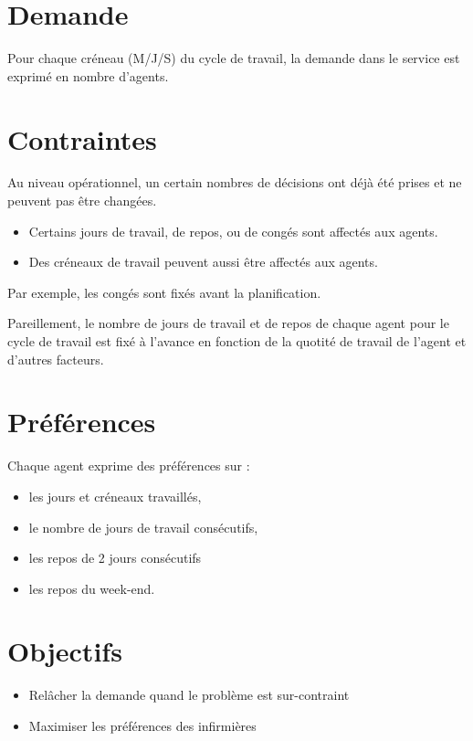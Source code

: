 \documentclass[a4paper]{article}       %
\begin{document}
\section*{Demande}
Pour chaque créneau (M/J/S) du cycle de travail, la demande dans le service est exprimé en nombre d'agents.
\section*{Contraintes}
Au niveau opérationnel, un certain nombres de décisions ont déjà été prises et ne peuvent pas être changées.  
\begin{itemize}
\item Certains jours de travail, de repos, ou de congés sont affectés aux agents.
\item Des créneaux de travail peuvent aussi être affectés aux agents.
\end{itemize}
Par exemple, les congés sont fixés avant la planification.

Pareillement, le nombre de jours de travail et de repos de chaque agent pour le cycle de travail est fixé à l'avance en fonction de la quotité de travail de l'agent et d'autres facteurs. 

\section*{Préférences}
Chaque agent exprime des préférences sur : 
\begin{itemize}
\item les jours et créneaux travaillés,
\item le nombre de jours de travail consécutifs,
\item les repos de 2 jours consécutifs
\item les repos du week-end.
\end{itemize}


\section*{Objectifs}
\begin{itemize}
\item Relâcher la demande quand le problème est sur-contraint
\item Maximiser les préférences des infirmières
\end{itemize}


       
\end{document}
